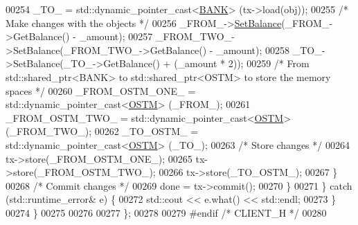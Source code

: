 \begin{DoxyCode}
00254                 \_TO\_ = std::dynamic\_pointer\_cast<\hyperlink{class_b_a_n_k}{BANK}> (tx->load(obj));
00255                 \textcolor{comment}{/* Make changes with the objects */}
00256                 \_FROM\_->\hyperlink{class_b_a_n_k_ae3e45b407bf8ec7175662442ea24b7c0_ae3e45b407bf8ec7175662442ea24b7c0}{SetBalance}(\_FROM\_->GetBalance() - \_amount);
00257                 \_FROM\_TWO\_->SetBalance(\_FROM\_TWO\_->GetBalance() - \_amount);
00258                 \_TO\_->SetBalance(\_TO\_->GetBalance() + (\_amount * 2));
00259                 \textcolor{comment}{/* From std::shared\_ptr<BANK> to std::shared\_ptr<OSTM> to store the memory spaces */}
00260                 \_FROM\_OSTM\_ONE\_ = std::dynamic\_pointer\_cast<\hyperlink{class_o_s_t_m}{OSTM}> (\_FROM\_);
00261                 \_FROM\_OSTM\_TWO\_ = std::dynamic\_pointer\_cast<\hyperlink{class_o_s_t_m}{OSTM}> (\_FROM\_TWO\_);
00262                 \_TO\_OSTM\_ = std::dynamic\_pointer\_cast<\hyperlink{class_o_s_t_m}{OSTM}> (\_TO\_);
00263                 \textcolor{comment}{/* Store changes */}
00264                 tx->store(\_FROM\_OSTM\_ONE\_);
00265                 tx->store(\_FROM\_OSTM\_TWO\_);
00266                 tx->store(\_TO\_OSTM\_);
00267             \}
00268             \textcolor{comment}{/* Commit changes */}
00269             done = tx->commit();
00270         \}
00271     \} \textcolor{keywordflow}{catch} (std::runtime\_error& e) \{
00272         std::cout << e.what() << std::endl;
00273     \}
00274 \}
00275 
00276 
00277 \};
00278 
00279 \textcolor{preprocessor}{#endif }\textcolor{comment}{/* CLIENT\_H */}\textcolor{preprocessor}{}
00280 
\end{DoxyCode}
